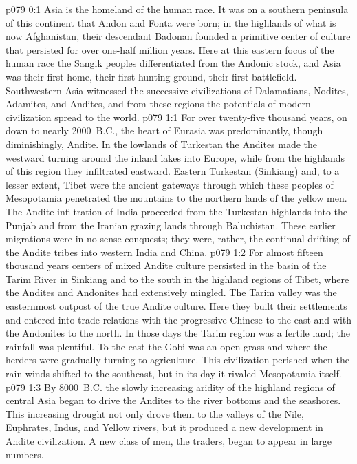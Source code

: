 \author{Archangel}
\vs p079 0:1 Asia is the homeland of the human race. It was on a southern peninsula of this continent that Andon and Fonta were born; in the highlands of what is now Afghanistan, their descendant Badonan founded a primitive center of culture that persisted for over one\hyp{}half million years. Here at this eastern focus of the human race the Sangik peoples differentiated from the Andonic stock, and Asia was their first home, their first hunting ground, their first battlefield. Southwestern Asia witnessed the successive civilizations of Dalamatians, Nodites, Adamites, and Andites, and from these regions the potentials of modern civilization spread to the world.\plusone
{}
\vs p079 1:1 For over twenty\hyp{}five thousand years, on down to nearly 2000~B.C., the heart of Eurasia was predominantly, though diminishingly, Andite. In the lowlands of Turkestan the Andites made the westward turning around the inland lakes into Europe, while from the highlands of this region they infiltrated eastward. Eastern Turkestan (Sinkiang) and, to a lesser extent, Tibet were the ancient gateways through which these peoples of Mesopotamia penetrated the mountains to the northern lands of the yellow men. The Andite infiltration of India proceeded from the Turkestan highlands into the Punjab and from the Iranian grazing lands through Baluchistan. These earlier migrations were in no sense conquests; they were, rather, the continual drifting of the Andite tribes into western India and China.
\pc \vs p079 1:2 For almost fifteen thousand years centers of mixed Andite culture persisted in the basin of the Tarim River in Sinkiang and to the south in the highland regions of Tibet, where the Andites and Andonites had extensively mingled. The Tarim valley was the easternmost outpost of the true Andite culture. Here they built their settlements and entered into trade relations with the progressive Chinese to the east and with the Andonites to the north. In those days the Tarim region was a fertile land; the rainfall was plentiful. To the east the Gobi was an open grassland where the herders were gradually turning to agriculture. This civilization perished when the rain winds shifted to the southeast, but in its day it rivaled Mesopotamia itself.
\pc \vs p079 1:3 By 8000~B.C. the slowly increasing aridity of the highland regions of central Asia began to drive the Andites to the river bottoms and the seashores. This increasing drought not only drove them to the valleys of the Nile, Euphrates, Indus, and Yellow rivers, but it produced a new development in Andite civilization. A new class of men, the traders, began to appear in large numbers.
